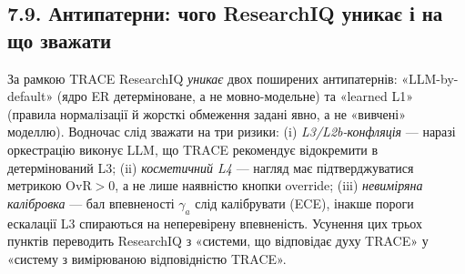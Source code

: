 \subsection*{7.9. Антипатерни: чого ResearchIQ уникає і на що зважати}

За рамкою TRACE ResearchIQ \emph{уникає} двох поширених антипатернів: «LLM-by-default» (ядро ER детерміноване, а не мовно-модельне) та «learned L1» (правила нормалізації й жорсткі обмеження задані явно, а не «вивчені» моделлю). Водночас слід зважати на три ризики: (i) \emph{L3/L2b-конфляція} --- наразі оркестрацію виконує LLM, що TRACE рекомендує відокремити в детермінований L3; (ii) \emph{косметичний L4} --- нагляд має підтверджуватися метрикою $\mathrm{OvR}>0$, а не лише наявністю кнопки override; (iii) \emph{невиміряна калібровка} --- бал впевненості $\gamma_a$ слід калібрувати (ECE), інакше пороги ескалації L3 спираються на неперевірену впевненість. Усунення цих трьох пунктів переводить ResearchIQ з «системи, що відповідає духу TRACE» у «систему з вимірюваною відповідністю TRACE».

